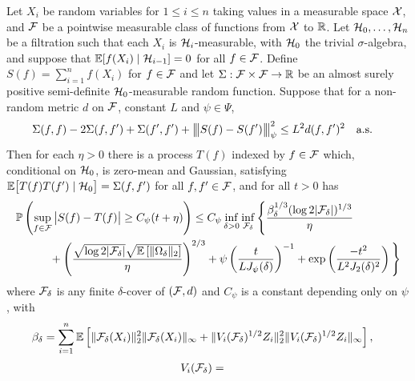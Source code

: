 \begin{proposition}%
  \label{pro:emp_proc}

  Let $X_i$ be random variables for $1 \leq i \leq n$ taking values in a
  measurable space $\mathcal{X}$, and $\mathcal{F}$ be a pointwise measurable class of
  functions from $\mathcal{X}$ to $\mathbb{R}$. Let $\mathcal{H}_0, \ldots, \mathcal{H}_n$ be a filtration such
  that each $X_i$ is $\mathcal{H}_i$-measurable, with $\mathcal{H}_0$ the trivial
  $\sigma$-algebra, and suppose that $\mathbb{E}[f(X_i) \mid \mathcal{H}_{i-1}] = 0$ for all
  $f \in \mathcal{F}$. Define $S(f) = \sum_{i=1}^n f(X_i)$ for $f\in\mathcal{F}$ and let
  $\Sigma: \mathcal{F} \times \mathcal{F} \to \mathbb{R}$ be an almost surely positive semi-definite
  $\mathcal{H}_0$-measurable random function. Suppose that for a non-random
  metric $d$ on $\mathcal{F}$, constant $L$ and $\psi \in \Psi$,
  \begin{align}%
    \label{eq:emp_proc_var}
    \Sigma(f,f) - 2\Sigma(f,f') + \Sigma(f',f')
    + \bigvvvert S(f) - S(f') \bigvvvert_\psi^2
    &\leq L^2 d(f,f')^2 \quad \text{a.s.}
  \end{align}
  Then for each $\eta > 0$ there is a
  process $T(f)$ indexed by $f\in\mathcal{F}$
  which, conditional on $\mathcal{H}_0$, is zero-mean and Gaussian,
  satisfying
  $\mathbb{E}\big[ T(f) T(f') \mid \mathcal{H}_0 \big] = \Sigma(f,f')$
  for all $f, f' \in \mathcal{F}$, and for all $t > 0$ has
  \begin{align*}
    &\mathbb{P}\left(
      \sup_{f \in \mathcal{F}}
      \big| S(f) - T(f) \big|
      \geq C_\psi(t + \eta)
    \right)
    \leq
    C_\psi
    \inf_{\delta > 0}
    \inf_{\mathcal{F}_\delta}
    \Bigg\{
    \frac{\beta_\delta^{1/3} (\log 2 |\mathcal{F}_\delta|)^{1/3}}{\eta } \\
    &\qquad\quad+
    \left(\frac{\sqrt{\log 2 |\mathcal{F}_\delta|}
        \sqrt{\mathbb{E}\left[\|\Omega_\delta\|_2\right]}}{\eta }\right)^{2/3}
    + \psi\left(\frac{t}{L J_\psi(\delta)}\right)^{-1}
    + \exp\left(\frac{-t^2}{L^2 J_2(\delta)^2}\right)
    \Bigg\}
  \end{align*}
  where $\mathcal{F}_\delta$ is any finite $\delta$-cover of $(\mathcal{F},d)$
  and $C_\psi$ is a constant depending only on $\psi$, with
  \begin{align*}
    \beta_\delta
    &= \sum_{i=1}^n
    \mathbb{E}\left[ \|\mathcal{F}_\delta(X_i)\|^2_2\|\mathcal{F}_\delta(X_i)\|_\infty
      + \|V_i(\mathcal{F}_\delta)^{1/2}Z_i\|^2_2
      \|V_i(\mathcal{F}_\delta)^{1/2}Z_i\|_\infty \right],
  \end{align*}
  \vspace*{-6mm}
  \begin{align*}
    V_i(\cF_\delta)
    &=

\end{align*}
\end{proposition}
